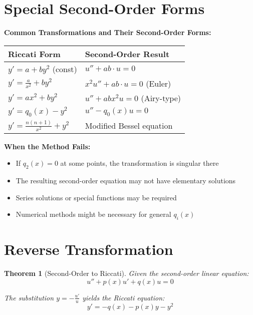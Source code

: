 \documentclass[12pt]{article}
\newtheorem{theorem}{Theorem}
\begin{document}
\section{Special Second-Order Forms}

\begin{keypoint}
\textbf{Common Transformations and Their Second-Order Forms:}
\begin{center}
\begin{tabular}{|l|l|}
\hline
\textbf{Riccati Form} & \textbf{Second-Order Result} \\
\hline
$y' = a + by^2$ (const) & $u'' + ab \cdot u = 0$ \\
$y' = \frac{a}{x^2} + by^2$ & $x^2u'' + ab \cdot u = 0$ (Euler) \\
$y' = ax^2 + by^2$ & $u'' + abx^2 u = 0$ (Airy-type) \\
$y' = q_0(x) - y^2$ & $u'' - q_0(x)u = 0$ \\
$y' = \frac{n(n+1)}{x^2} + y^2$ & Modified Bessel equation \\
\hline
\end{tabular}
\end{center}
\end{keypoint}

\begin{warning}
\textbf{When the Method Fails:}
\begin{itemize}
    \item If $q_2(x) = 0$ at some points, the transformation is singular there
    \item The resulting second-order equation may not have elementary solutions
    \item Series solutions or special functions may be required
    \item Numerical methods might be necessary for general $q_i(x)$
\end{itemize}
\end{warning}

\section{Reverse Transformation}

\begin{theorem}[Second-Order to Riccati]
Given the second-order linear equation:
$$u'' + p(x)u' + q(x)u = 0$$

The substitution $y = -\frac{u'}{u}$ yields the Riccati equation:
$$y' = -q(x) - p(x)y - y^2$$
\end{theorem}
\end{document}
